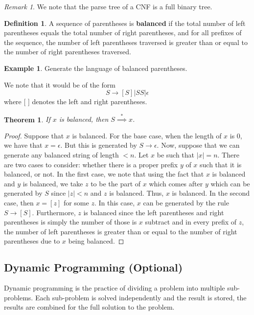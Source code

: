 \documentclass[11pt]{article}
\theoremstyle{plain} %
\newtheorem*{theorem}{Theorem}
\theoremstyle{definition}
\newtheorem*{definition}{Definition} %
\theoremstyle{example}
\newtheorem*{example}{Example}
\theoremstyle{remark}
\newtheorem*{remark}{Remark}
\begin{document}
\begin{remark}
We note that the parse tree of a CNF is a full binary tree.
\end{remark}

\begin{definition}
A sequence of parentheses is \textbf{balanced} if the total number of left parentheses equals the total number of right parentheses, and for all prefixes of the sequence, the number of left parentheses traversed is greater than or equal to the number of right parentheses traversed. 
\end{definition}

\begin{example}
Generate the language of balanced parentheses.
\end{example}

We note that it would be of the form  $$S \rightarrow [S]|SS|\epsilon$$ where [ ] denotes the left and right parentheses.

\begin{theorem}If $x$ is balanced, then $S \overset{*}{\implies} x$.
\end{theorem}


\begin{proof}
Suppose that $x$ is balanced. For the base case, when the length of $x$ is 0, we have that $x = \epsilon$. But this is generated by $S \rightarrow \epsilon$. Now, suppose that we can generate any balanced string of length $<n$. Let $x$ be such that $|x| = n$. There are two cases to consider: whether there is a proper prefix $y$ of $x$ such that it is balanced, or not. In the first case, we note that using the fact that $x$ is balanced and $y$ is balanced, we take $z$ to be the part of $x$ which comes after $y$ which can be generated by $S$ since $|z| < n$ and $z$ is balanced. Thus, $x$ is balanced. In the second case, then $x=[z]$ for some $z$. In this case, $x$ can be generated by the rule $ S \rightarrow [S]$. Furthermore, $z$ is balanced since the left parentheses and right parentheses is simply the number of those is $x$ subtract and in every prefix of $z$, the number of left parentheses is greater than or equal to the number of right parentheses due to $x$ being balanced.


\end{proof}







\subsection{Dynamic Programming (Optional)}
Dynamic programming is the practice of dividing a problem into multiple sub-problems. Each sub-problem is solved independently and the result is stored, the results are combined for the full solution to the problem. 
\end{document}
